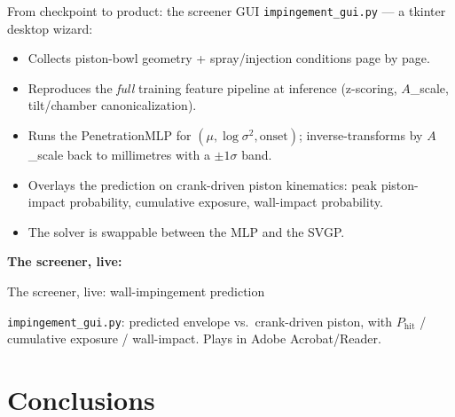 \documentclass[aspectratio=169,11pt]{beamer}
\newcommand{\blue}[1]{\textcolor{aaltoBlue}{#1}}
\begin{document}
\begin{frame}{From checkpoint to product: the screener GUI}
\small
\texttt{impingement\_gui.py} --- a tkinter desktop wizard:
\begin{itemize}\setlength\itemsep{2pt}
  \item Collects piston-bowl geometry + spray/injection conditions page by page.
  \item Reproduces the \emph{full} training feature pipeline at inference
        (z-scoring, $A$\_scale, tilt/chamber canonicalization).
  \item Runs the PenetrationMLP for $(\mu, \log\sigma^2, \text{onset})$;
        inverse-transforms by $A$\_scale back to millimetres with a
        $\pm 1\sigma$ band.
  \item Overlays the prediction on crank-driven piston kinematics: peak
        piston-impact probability, cumulative exposure, wall-impact probability.
  \item The \blue{solver is swappable between the MLP and the SVGP}.
\end{itemize}
\vspace{0.3em}
\centering\textbf{The screener, live:}
\end{frame}

\begin{frame}{The screener, live: wall-impingement prediction}
\centering
{}

{\scriptsize \texttt{impingement\_gui.py}: predicted envelope vs.\ crank-driven piston, with $P_{\mathrm{hit}}$ / cumulative exposure / wall-impact. Plays in Adobe Acrobat/Reader.}
\end{frame}

\section{Conclusions}
\end{document}
